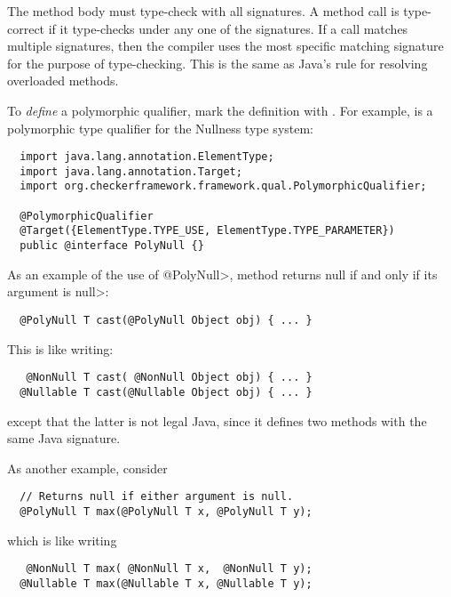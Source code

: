 The method body must type-check with all signatures.  A method call is
type-correct if it type-checks under any one of the signatures.  If a call
matches multiple signatures, then the compiler uses the most specific
matching signature for the purpose of type-checking.  This is the same as
Java's rule for resolving overloaded methods.

To \emph{define} a polymorphic qualifier, mark the definition with
.  For example,
 is a polymorphic type
qualifier for the Nullness type system:

\begin{Verbatim}
  import java.lang.annotation.ElementType;
  import java.lang.annotation.Target;
  import org.checkerframework.framework.qual.PolymorphicQualifier;

  @PolymorphicQualifier
  @Target({ElementType.TYPE_USE, ElementType.TYPE_PARAMETER})
  public @interface PolyNull {}
\end{Verbatim}



As an example of the use of \<@PolyNull>, method
returns null if and only if its argument is \<null>:

\begin{Verbatim}
  @PolyNull T cast(@PolyNull Object obj) { ... }
\end{Verbatim}

\noindent
This is like writing:

\begin{Verbatim}
   @NonNull T cast( @NonNull Object obj) { ... }
  @Nullable T cast(@Nullable Object obj) { ... }
\end{Verbatim}

\noindent
except that the latter is not legal Java, since it defines two
methods with the same Java signature.


As another example, consider

\begin{Verbatim}
  // Returns null if either argument is null.
  @PolyNull T max(@PolyNull T x, @PolyNull T y);
\end{Verbatim}

\noindent
which is like writing

\begin{Verbatim}
   @NonNull T max( @NonNull T x,  @NonNull T y);
  @Nullable T max(@Nullable T x, @Nullable T y);
\end{Verbatim}

